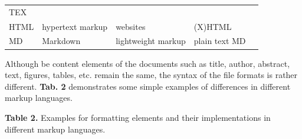 \documentclass[10pt,fleqn]{wlpeerj}
\begin{document}
\begin{longtable}[]{@{}lllll@{}}
\begin{minipage}[t]{0.10\columnwidth}
TEX
\strut\end{minipage}
&
\begin{minipage}[t]{0.41\columnwidth}\raggedright\strut
\citep{lamport_latex:_1994}
\strut\end{minipage}\tabularnewline
\begin{minipage}[t]{0.06\columnwidth}\raggedright\strut
HTML
\strut\end{minipage}
&
\begin{minipage}[t]{0.15\columnwidth}\raggedright\strut
hypertext
markup
\strut\end{minipage}
&
\begin{minipage}[t]{0.13\columnwidth}\raggedright\strut
websites
\strut\end{minipage}
&
\begin{minipage}[t]{0.10\columnwidth}\raggedright\strut
(X)HTML
\strut\end{minipage}
&
\begin{minipage}[t]{0.41\columnwidth}\raggedright\strut
\citep{HTML4, HTML5}
\strut\end{minipage}\tabularnewline
\begin{minipage}[t]{0.06\columnwidth}\raggedright\strut
MD
\strut\end{minipage}
&
\begin{minipage}[t]{0.15\columnwidth}\raggedright\strut
Markdown
\strut\end{minipage}
&
\begin{minipage}[t]{0.13\columnwidth}\raggedright\strut
lightweight
markup
\strut\end{minipage}
&
\begin{minipage}[t]{0.10\columnwidth}\raggedright\strut
plain
text
MD
\strut\end{minipage}
&
\begin{minipage}[t]{0.41\columnwidth}\raggedright\strut
\citep{ovadia_markdown_2014, rfc7764}
\strut\end{minipage}\tabularnewline
\bottomrule
\end{longtable}

Although
be
content
elements
of
the
documents
such
as
title,
author,
abstract,
text,
figures,
tables,
etc.
remain
the
same,
the
syntax
of
the
file
formats
is
rather
different.
\textbf{Tab.
2}
demonstrates
some
simple
examples
of
differences
in
different
markup
languages.

\textbf{Table
2.}
Examples
for
formatting
elements
and
their
implementations
in
different
markup
languages.
\end{document}
